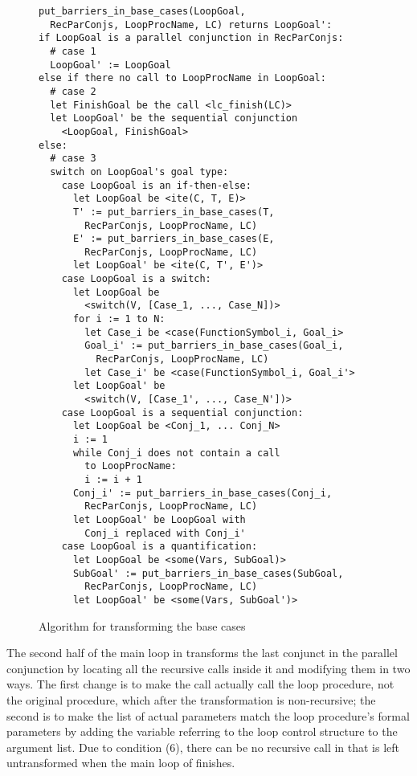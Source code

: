 \begin{figure}[tb]
\begin{center}
{\small
\begin{verbatim}
put_barriers_in_base_cases(LoopGoal,
  RecParConjs, LoopProcName, LC) returns LoopGoal':
if LoopGoal is a parallel conjunction in RecParConjs:
  # case 1
  LoopGoal' := LoopGoal
else if there no call to LoopProcName in LoopGoal:
  # case 2
  let FinishGoal be the call <lc_finish(LC)>
  let LoopGoal' be the sequential conjunction
    <LoopGoal, FinishGoal>
else:
  # case 3
  switch on LoopGoal's goal type:
    case LoopGoal is an if-then-else:
      let LoopGoal be <ite(C, T, E)>
      T' := put_barriers_in_base_cases(T,
        RecParConjs, LoopProcName, LC)
      E' := put_barriers_in_base_cases(E,
        RecParConjs, LoopProcName, LC)
      let LoopGoal' be <ite(C, T', E')>
    case LoopGoal is a switch:
      let LoopGoal be
        <switch(V, [Case_1, ..., Case_N])>
      for i := 1 to N:
        let Case_i be <case(FunctionSymbol_i, Goal_i>
        Goal_i' := put_barriers_in_base_cases(Goal_i,
          RecParConjs, LoopProcName, LC)
        let Case_i' be <case(FunctionSymbol_i, Goal_i'>
      let LoopGoal' be
        <switch(V, [Case_1', ..., Case_N'])>
    case LoopGoal is a sequential conjunction:
      let LoopGoal be <Conj_1, ... Conj_N>
      i := 1
      while Conj_i does not contain a call
        to LoopProcName:
        i := i + 1
      Conj_i' := put_barriers_in_base_cases(Conj_i,
        RecParConjs, LoopProcName, LC)
      let LoopGoal' be LoopGoal with
        Conj_i replaced with Conj_i'
    case LoopGoal is a quantification:
      let LoopGoal be <some(Vars, SubGoal)>
      SubGoal' := put_barriers_in_base_cases(SubGoal,
        RecParConjs, LoopProcName, LC)
      let LoopGoal' be <some(Vars, SubGoal')>
\end{verbatim}
}
\end{center}
\caption{Algorithm for transforming the base cases}
\label{fig:basecases_alg}
\end{figure}

The second half of the main loop in \createloopgoal
transforms the last conjunct in the parallel conjunction
by locating all the recursive calls inside it
and modifying them in two ways.
The first change is to make the call actually call the loop procedure,
not the original procedure, which after the transformation is non-recursive;
the second is to make the list of actual parameters match
the loop procedure's formal parameters
by adding the variable referring to the loop control structure
to the argument list.
Due to condition (6),
there can be no recursive call in  that is left untransformed
when the main loop of \createloopgoal finishes.

